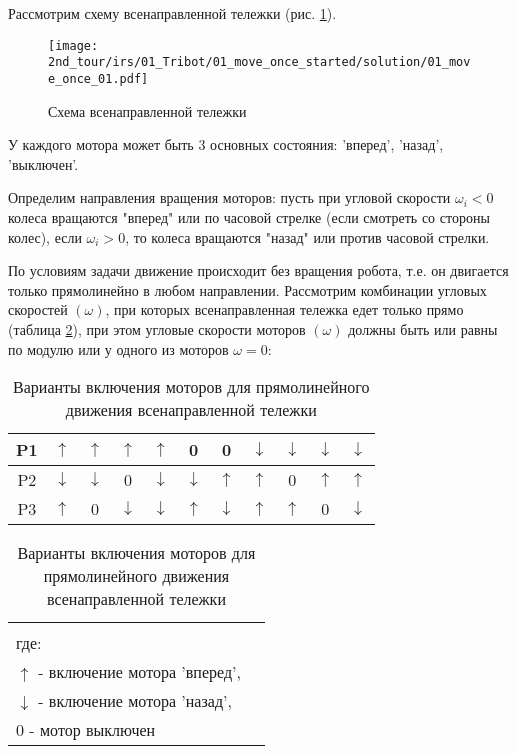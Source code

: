 \solutionSection

Рассмотрим схему всенаправленной тележки (рис. \ref{fig:01_move_once_01}).
\begin{figure}[h!]
	\centering
	\texttt{[image: 2nd\_tour/irs/01\_Tribot/01\_move\_once\_started/solution/01\_move\_once\_01.pdf]}
	\caption{Схема всенаправленной тележки}
	\label{fig:01_move_once_01}
\end{figure}

У каждого мотора может быть 3 основных состояния: 'вперед', 'назад', 'выключен'.

Определим направления вращения моторов: пусть при угловой скорости $\omega_i < 0$ колеса вращаются "вперед" или по часовой стрелке (если смотреть со стороны колес), если $\omega_i > 0$, то колеса вращаются "назад" или против часовой стрелки.

По условиям задачи движение происходит без вращения робота, т.е. он двигается только прямолинейно в любом направлении. Рассмотрим комбинации угловых скоростей $(\omega)$, при которых всенаправленная тележка едет только прямо (таблица \ref{table:01_move_once_01}), при этом угловые скорости моторов $(\omega)$ должны быть или равны по модулю или у одного из моторов $\omega = 0$:

\begin{table}[h!]
	\begin{center}
	\begin{tabular}{|c|c|c|c|c|c|c|c|c|c|c|}
		\hline
		P1 & $\uparrow$ & $\uparrow$ & $\uparrow$ & $\uparrow$ & 0 & 0 & $\downarrow$ & $\downarrow$ & $\downarrow$ & $\downarrow$ \\
		\hline
		P2 & $\downarrow$ & $\downarrow$ & 0 & $\downarrow$ & $\downarrow$ & $\uparrow$ & $\uparrow$ & 0 & $\uparrow$ & $\uparrow$\\
		\hline
		P3 & $\uparrow$ & 0 & $\downarrow$ & $\downarrow$ & $\uparrow$ & $\downarrow$ & $\uparrow$ & $\uparrow$ & 0 & $\downarrow$\\
		\hline
	\end{tabular}

	\begin{tabular}{c|c|c|c|c|c|c|c|c|c|c|c}
		\multicolumn{11}{c}{} \\
		\multicolumn{11}{l}{где:} \\
		\multicolumn{11}{l}{$\uparrow$ - включение мотора 'вперед',} \\
		\multicolumn{11}{l}{$\downarrow$ - включение мотора 'назад',} \\
		\multicolumn{11}{l}{$0$ - мотор выключен} \\
	\end{tabular} 
	\caption{Варианты включения моторов для прямолинейного движения всенаправленной тележки}
	\label{table:01_move_once_01}
	\end{center}
\end{table}

